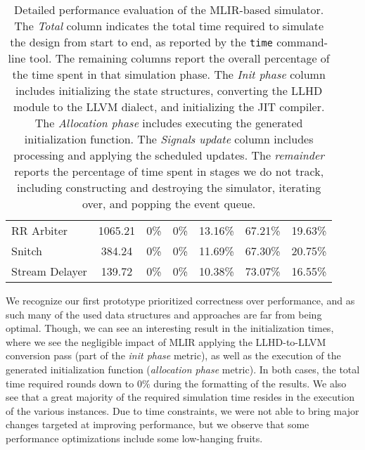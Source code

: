 \begin{table}[ht]
{\begin{tabular}{lcccccc}
      RR Arbiter      & 1065.21            & 0\%                       & 0\%                       & 13.16\%                    & 67.21\%                    & 19.63\%            \\
      Snitch          & 384.24             & 0\%                       & 0\%                       & 11.69\%                    & 67.30\%                    & 20.75\%            \\
      Stream Delayer  & 139.72             & 0\%                       & 0\%                       & 10.38\%                    & 73.07\%                    & 16.55\%            \\
      \bottomrule
    \end{tabular}
  }
  \caption[Detailed performance evaluation of the MLIR-based simulator]{Detailed performance evaluation of the MLIR-based simulator. The \textit{Total} column indicates the total time required to simulate the design from start to end, as reported by the \texttt{time} command-line tool. The remaining columns report the overall percentage of the time spent in that simulation phase. The \textit{Init phase} column includes initializing the state structures, converting the LLHD module to the LLVM dialect, and initializing the JIT compiler. The \textit{Allocation phase} includes executing the generated initialization function. The \textit{Signals update} column includes processing and applying the scheduled updates. The \textit{remainder} reports the percentage of time spent in stages we do not track, including constructing and destroying the simulator, iterating over, and popping the event queue.}
  \label{tab:time_detail0}
\end{table}

We recognize our first prototype prioritized correctness over performance, and as such many of the used data structures and approaches are far from being optimal. Though, we can see an interesting result in the initialization times, where we see the negligible impact of MLIR applying the LLHD-to-LLVM conversion pass (part of the \textit{init phase} metric), as well as the execution of the generated initialization function (\textit{allocation phase} metric). In both cases, the total time required rounds down to $0\%$ during the formatting of the results. We also see that a great majority of the required simulation time resides in the execution of the various instances. Due to time constraints, we were not able to bring major changes targeted at improving performance, but we observe that some performance optimizations include some low-hanging fruits.

